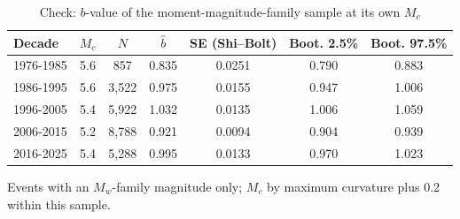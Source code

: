 \begin{table}[t]
\centering
\begin{threeparttable}
\caption{Check: $b$-value of the moment-magnitude-family sample at its own $M_c$}
\label{tab:check_mw}
\begin{tabular}{lcccccc}
\toprule
Decade & $M_c$ & $N$ & $\hat b$ & SE (Shi--Bolt) & Boot. 2.5\% & Boot. 97.5\% \\
\midrule
1976-1985 & 5.6 & 857 & 0.835 & 0.0251 & 0.790 & 0.883 \\
1986-1995 & 5.6 & 3,522 & 0.975 & 0.0155 & 0.947 & 1.006 \\
1996-2005 & 5.4 & 5,922 & 1.032 & 0.0135 & 1.006 & 1.059 \\
2006-2015 & 5.2 & 8,788 & 0.921 & 0.0094 & 0.904 & 0.939 \\
2016-2025 & 5.4 & 5,288 & 0.995 & 0.0133 & 0.970 & 1.023 \\
\bottomrule
\end{tabular}
\begin{tablenotes}[flushleft]
\footnotesize
\item Events with an $M_w$-family magnitude only; $M_c$ by maximum curvature plus 0.2 within this sample.
\end{tablenotes}
\end{threeparttable}
\end{table}
